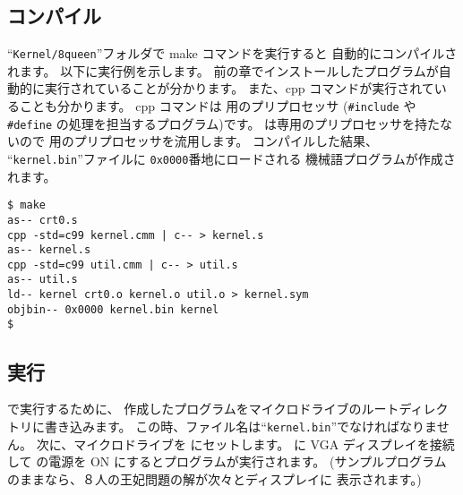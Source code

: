 \subsection{コンパイル}

``{\tt Kernel/8queen}''フォルダで make コマンドを実行すると
自動的にコンパイルされます。
以下に実行例を示します。
前の章でインストールしたプログラムが自動的に実行されていることが分かります。
また、cpp コマンドが実行されていることも分かります。
cpp コマンドは \cl 用のプリプロセッサ
(\verb/#include/ や \verb/#define/ の処理を担当するプログラム)です。
\cmml は専用のプリプロセッサを持たないので \cl 用のプリプロセッサを流用します。
コンパイルした結果、
``{\tt kernel.bin}''ファイルに {\tt 0x0000}番地にロードされる
機械語プログラムが作成されます。

\begin{mylist}
\begin{verbatim}
$ make
as-- crt0.s
cpp -std=c99 kernel.cmm | c-- > kernel.s
as-- kernel.s
cpp -std=c99 util.cmm | c-- > util.s
as-- util.s
ld-- kernel crt0.o kernel.o util.o > kernel.sym
objbin-- 0x0000 kernel.bin kernel
$
\end{verbatim}
\end{mylist}

\subsection{実行}

\tac で実行するために、
作成したプログラムをマイクロドライブのルートディレクトリに書き込みます。
この時、ファイル名は``{\tt kernel.bin}''でなければなりません。
次に、マイクロドライブを \tac にセットします。
\tac に VGA ディスプレイを接続して
\tac の電源を ON にするとプログラムが実行されます。
(サンプルプログラムのままなら、８人の王妃問題の解が次々とディスプレイに
表示されます。)
